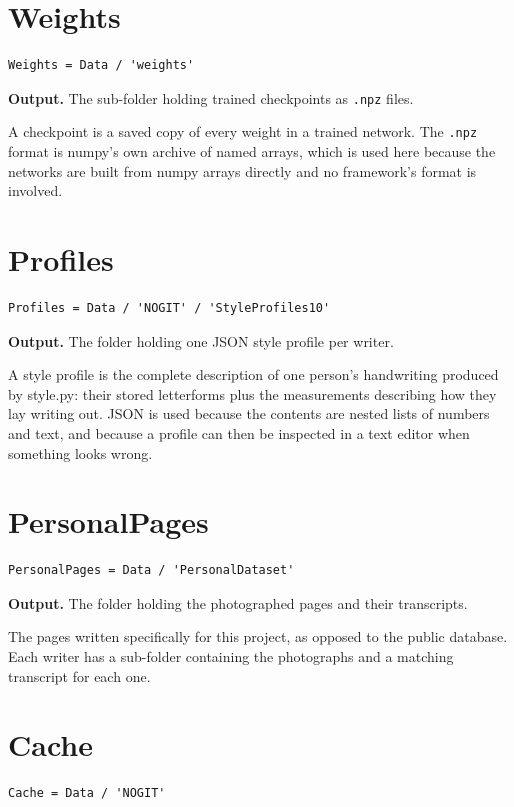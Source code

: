 \section{Weights}
\begin{lstlisting}[style=sig]
Weights = Data / 'weights'
\end{lstlisting}

\noindent\textbf{Output.} The sub-folder holding trained checkpoints as \texttt{.npz} files.

A checkpoint is a saved copy of every weight in a trained network. The \texttt{.npz} format is numpy's own archive of named arrays, which is used here because the networks are built from numpy arrays directly and no framework's format is involved.


\section{Profiles}
\begin{lstlisting}[style=sig]
Profiles = Data / 'NOGIT' / 'StyleProfiles10'
\end{lstlisting}

\noindent\textbf{Output.} The folder holding one JSON style profile per writer.

A style profile is the complete description of one person's handwriting produced by style.py: their stored letterforms plus the measurements describing how they lay writing out. JSON is used because the contents are nested lists of numbers and text, and because a profile can then be inspected in a text editor when something looks wrong.


\section{PersonalPages}
\begin{lstlisting}[style=sig]
PersonalPages = Data / 'PersonalDataset'
\end{lstlisting}

\noindent\textbf{Output.} The folder holding the photographed pages and their transcripts.

The pages written specifically for this project, as opposed to the public database. Each writer has a sub-folder containing the photographs and a matching transcript for each one.


\section{Cache}
\begin{lstlisting}[style=sig]
Cache = Data / 'NOGIT'
\end{lstlisting}

